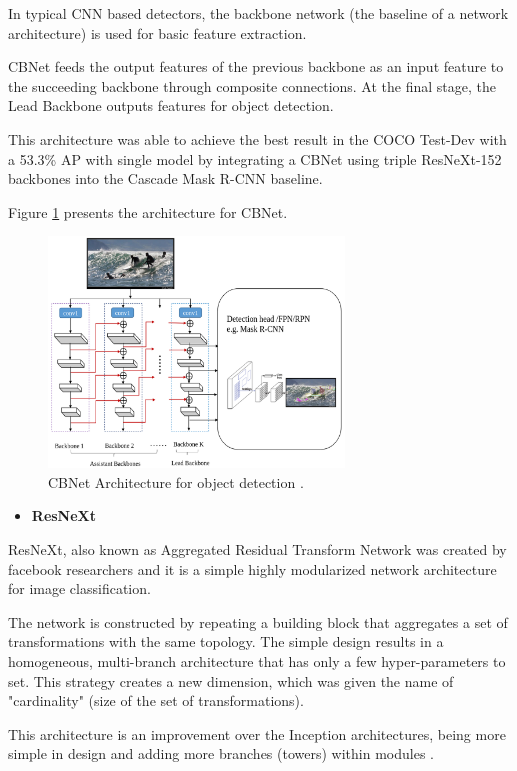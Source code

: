 \par In typical CNN based detectors, the backbone network (the baseline of a network architecture) is used for basic feature extraction.

\par CBNet feeds the output features of the previous backbone as an input feature to the succeeding backbone through composite connections. At the final stage, the Lead Backbone outputs features for object detection.

\par This architecture was able to achieve the best result in the COCO Test-Dev with a 53.3\% AP with single model by integrating a CBNet using triple ResNeXt-152 \cite{Xie2017} backbones into the Cascade Mask R-CNN baseline.


\par Figure \ref{fig:cbnet} presents the architecture for CBNet.



\begin{figure}[H]
    \centering
    \captionsetup{justification=centering}
    \includegraphics[width=0.7\textwidth]{Sections/2StateOfTheArt/2_images/cbnet.png}
    \caption[CBNet Architecture]{CBNet Architecture for object detection \cite{Liu2019}.} 
    \label{fig:cbnet}
\end{figure}


\begin{itemize}
    \item \textbf{ResNeXt}
\end{itemize}

\label{sec:resnext}
\par ResNeXt, also known as Aggregated Residual Transform Network was created by facebook researchers and it is a simple highly modularized network architecture for image classification. 
\par The network is constructed by repeating a building block that aggregates a set of transformations with the same topology. The simple design results in a homogeneous, multi-branch architecture that has only a few hyper-parameters to set. This strategy creates a new dimension, which was given the name of "cardinality" (size of the set of transformations). 
\par This architecture is an improvement over the Inception architectures, being more simple in design and adding more branches (towers) within modules \cite{Xie2017}.


